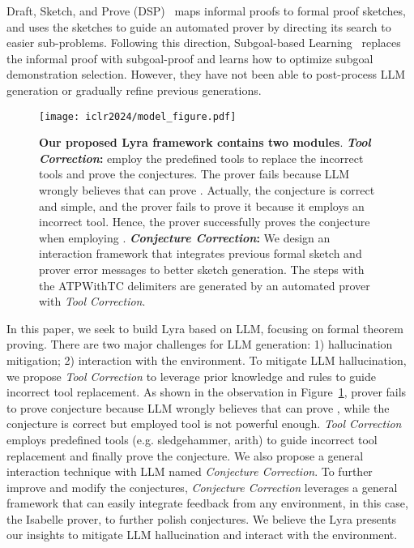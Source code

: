 \documentclass{article} \usepackage{iclr2024_conference,times}
\def\methodOneFull{\textit{Tool Correction}\xspace}
\def\methodTwoFull{\textit{Conjecture Correction}\xspace}
\def\fullname{Lyra\xspace}
\def\shortname{Lyra\xspace}
\begin{document}
Draft, Sketch, and Prove (DSP)~\citep{jiang2023draft} maps informal proofs to formal proof sketches, and uses the sketches to guide an automated prover by directing its search to easier sub-problems. Following this direction, Subgoal-based Learning~\citep{zhao2023decomposing} replaces the informal proof with subgoal-proof and learns how to optimize subgoal demonstration selection. However, they have not been able to post-process LLM generation or gradually refine previous generations.

\begin{figure}[ht]
\setlength{\abovecaptionskip}{0.1cm}
\texttt{[image: iclr2024/model\_figure.pdf]}
\caption{
\small
\textbf{Our proposed \shortname framework contains two modules}. \textbf{\methodOneFull:} employ the predefined tools to replace the incorrect tools and prove the conjectures. The prover fails because LLM wrongly believes that  can prove . Actually, the conjecture is correct and simple, and the prover fails to prove it because it employs an incorrect tool. Hence, the prover successfully proves the conjecture when employing . \textbf{\methodTwoFull:} We design an interaction framework that integrates previous formal sketch and prover error messages to better sketch generation. The steps with the \textcolor{patriarch}{ATPWithTC} delimiters are generated by an automated prover with \methodOneFull.
}
\vspace{-21.5pt}
\label{fig: model figure}

\end{figure}
In this paper, we seek to build \fullname based on LLM, focusing on formal theorem proving. There are two major challenges for LLM generation: 1) hallucination mitigation; 2) interaction with the environment.  To mitigate LLM hallucination, we propose \methodOneFull to leverage prior knowledge and rules to guide incorrect tool replacement. As shown in the observation in Figure~\ref{fig: model figure}, prover fails to prove conjecture  because LLM wrongly believes that  can prove , while the conjecture is correct but employed tool  is not powerful enough. \methodOneFull employs predefined tools (e.g. sledgehammer, arith) to guide incorrect tool replacement and finally prove the conjecture. We also propose a general interaction technique with LLM named \methodTwoFull. To further improve and modify the conjectures, \methodTwoFull leverages a general framework that can easily integrate feedback from any environment, in this case, the Isabelle prover, to further polish conjectures. We believe the \shortname presents our insights to mitigate LLM hallucination and interact with the environment.
\end{document}
